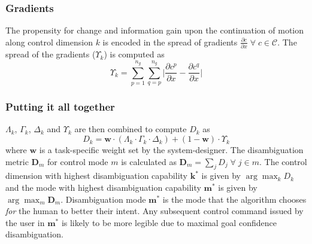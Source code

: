 \documentclass[conference]{IEEEtran}
\newcommand{\argmax}{\arg\!\max}
\begin{document}
\subsubsection{Gradients}
The propensity for change and information gain upon the continuation of motion along control dimension $k$ is encoded in the spread of gradients $\frac{\partial c}{\partial x}\; \forall\; c\in \mathcal{C}$. The spread of the gradients ($\Upsilon_{k}$) is computed as  
\begin{equation*}
\Upsilon_{k} = \sum_{p=1}^{n_g}\sum_{q=p}^{n_g}\Big \lvert\frac{\partial c^p}{\partial x} - \frac{\partial c^q}{\partial x}\Big \rvert
\end{equation*}

\subsubsection*{Putting it all together}
$\Lambda_{k}$, $\Gamma_{k}$, $\Delta_{k}$ and $\Upsilon_{k}$ are then combined to compute $D_{k}$ as 
\begin{equation*}\label{DK}
D_{k} = \boldsymbol{w}\cdot(\Lambda_{k}\cdot \Gamma_{k}\cdot \Delta_{k}) + (1 - \boldsymbol{w})\cdot \Upsilon_{k}
\end{equation*}
where $\boldsymbol{w}$ is a task-specific weight set by the system-designer.
The disambiguation metric $\boldsymbol{D}_m$ for control mode $m$ is calculated as $\boldsymbol{D}_m = \sum_{j} D_{j} \;\forall \;j\in m$.
The control dimension with highest disambiguation capability $\boldsymbol{k}^*$ is given by $\argmax_k D_{k}$
 and the mode with highest disambiguation capability $\boldsymbol{m}^{*}$ is given by $\argmax_m \boldsymbol{D}_m$.
Disambiguation mode $\boldsymbol{m}^{*}$ is the mode that the algorithm chooses \textit{for} the human to better their intent. Any subsequent control command issued by the user in $\boldsymbol{m}^*$ is likely to be more legible due to maximal goal confidence disambiguation.
\end{document}
